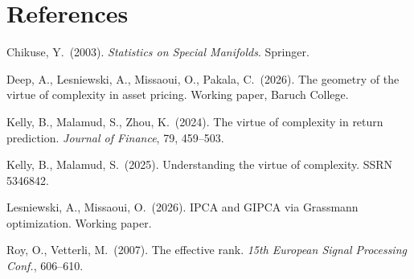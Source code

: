 \documentclass[11pt,a4paper]{article}
\begin{document}
\section{References}

\begin{enumerate}[nosep, label={[\arabic*]}]
  \item Chikuse, Y.\ (2003). \textit{Statistics on Special Manifolds}. Springer.
  \item Deep, A., Lesniewski, A., Missaoui, O., Pakala, C.\ (2026). The geometry of the virtue of complexity in asset pricing. Working paper, Baruch College.
  \item Kelly, B., Malamud, S., Zhou, K.\ (2024). The virtue of complexity in return prediction. \textit{Journal of Finance}, 79, 459--503.
  \item Kelly, B., Malamud, S.\ (2025). Understanding the virtue of complexity. SSRN 5346842.
  \item Lesniewski, A., Missaoui, O.\ (2026). IPCA and GIPCA via Grassmann optimization. Working paper.
  \item Roy, O., Vetterli, M.\ (2007). The effective rank. \textit{15th European Signal Processing Conf.}, 606--610.
\end{enumerate}
\end{document}
